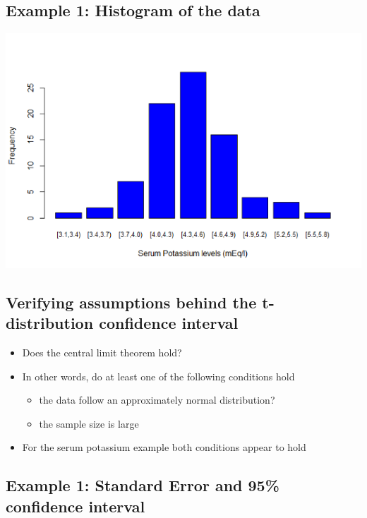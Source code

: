 \documentclass[
]{book}
\providecommand{\tightlist}{%
  \setlength{\itemsep}{0pt}\setlength{\parskip}{0pt}}
\begin{document}
\hypertarget{example-1-histogram-of-the-data}{%
\subsection{Example 1: Histogram of the data}\label{example-1-histogram-of-the-data}}

\includegraphics[width=0.5\linewidth]{./3_44}

\hypertarget{verifying-assumptions-behind-the-t-distribution-confidence-interval}{%
\subsection{Verifying assumptions behind the t-distribution confidence interval}\label{verifying-assumptions-behind-the-t-distribution-confidence-interval}}

\begin{itemize}
\tightlist
\item
  Does the central limit theorem hold?
\item
  In other words, do at least one of the following conditions hold

  \begin{itemize}
  \tightlist
  \item
    the data follow an approximately normal distribution?
  \item
    the sample size is large
  \end{itemize}
\item
  For the serum potassium example both conditions appear to hold
\end{itemize}

\hypertarget{example-1-standard-error-and-95-confidence-interval}{%
\subsection{Example 1: Standard Error and 95\% confidence interval}\label{example-1-standard-error-and-95-confidence-interval}}
\end{document}
